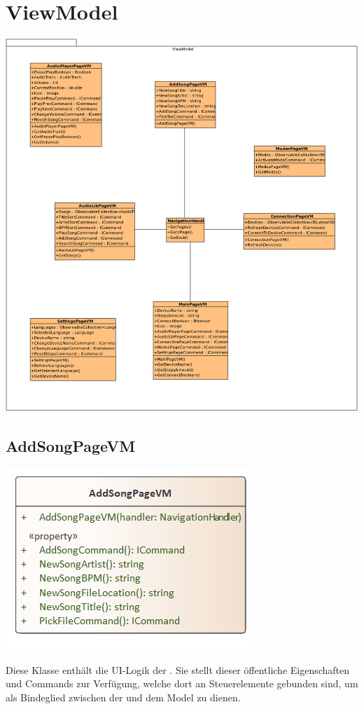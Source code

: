 \documentclass[../entwurf.tex]{subfiles}
\begin{document}
\section{ViewModel}
\includegraphics[scale=0.4]{../graphics/uml_diagramme/ViewModel.png}
\newpage
\subsection{AddSongPageVM}
\begin{minipage}{0.45\textwidth}
\includegraphics[scale=0.75]{../graphics/vm_klassen/AddSongPageVM.png}
\end{minipage}
\begin{minipage}{0.55\textwidth}
Diese Klasse enthält die UI-Logik der . Sie stellt dieser öffentliche Eigenschaften und Commands zur Verfügung, welche dort an Steuerelemente gebunden sind, um als Bindeglied zwischen der  und dem Model zu dienen.
\end{minipage}
\end{document}
